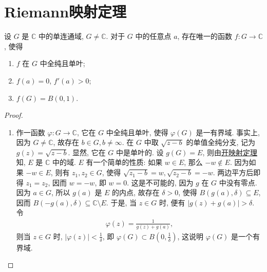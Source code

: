 \documentclass[../../main.tex]{subfiles}%
\begin{document}
\section{Riemann映射定理}

\begin{theorem}[Riemann映射定理]\label{theorem:Riemann映射定理}
设 \(G\) 是 \(\mathbb{C}\) 中的单连通域, \(G \neq \mathbb{C}\). 对于 \(G\) 中的任意点 \(a\), 存在唯一的函数 \(f: G \to \mathbb{C}\), 使得
\begin{enumerate}[(1)]
\item \(f\) 在 \(G\) 中全纯且单叶;
\item \(f(a) = 0\), \(f'(a) > 0\);
\item \(f(G) = B(0, 1)\).
\end{enumerate}
\end{theorem}
\begin{proof}
\begin{enumerate}[(1)]
\item 作一函数 \(\varphi: G \to \mathbb{C}\), 它在 \(G\) 中全纯且单叶, 使得 \(\varphi(G)\) 是一有界域. 事实上, 因为 \(G \neq \mathbb{C}\), 故存在 \(b \in G, b \neq \infty\). 在 \(G\) 中取 \(\sqrt{z-b}\) 的单值全纯分支, 记为 \(g(z) = \sqrt{z-b}\). 显然, 它在 \(G\) 中是单叶的. 设 \(g(G) = E\), 则由\hyperref[theorem:定理4.4.6-开映射定理]{开映射定理}知, \(E\) 是 \(\mathbb{C}\) 中的域. \(E\) 有一个简单的性质: 如果 \(w \in E\), 那么 \(-w \notin E\). 因为如果 \(-w \in E\), 则有 \(z_1, z_2 \in G\), 使得 \(\sqrt{z_1-b} = w, \sqrt{z_2-b} = -w\). 两边平方后即得 \(z_1 = z_2\), 因而 \(w = -w\), 即 \(w = 0\). 这是不可能的, 因为 \(g\) 在 \(G\) 中没有零点. 因为 \(a \in G\), 所以 \(g(a)\) 是 \(E\) 的内点, 故存在 \(\delta > 0\), 使得 \(B(g(a), \delta) \subseteq E\), 因而 \(B(-g(a), \delta) \subseteq \mathbb{C} \setminus E\). 于是, 当 \(z \in G\) 时, 便有 \(|g(z) + g(a)| > \delta\). 令
\begin{align*}
\varphi(z) = \frac{1}{g(z) + g(a)},
\end{align*}
则当 \(z \in G\) 时, \(|\varphi(z)| < \frac{1}{\delta}\), 即 \(\varphi(G) \subset B\left(0, \frac{1}{\delta}\right)\), 这说明 \(\varphi(G)\) 是一个有界域.


\end{enumerate}
\end{proof}
\end{document}
